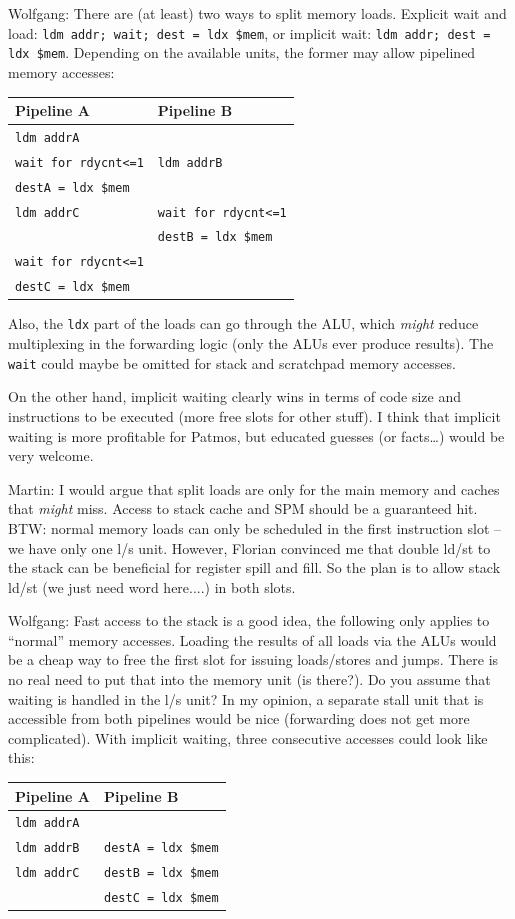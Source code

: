 \documentclass{IEEEtran}
\newcommand{\wolf}[1]{{\color{OliveGreen} Wolfgang: #1}}
\newcommand{\martin}[1]{{\color{blue} Martin: #1}}
\begin{document}
\wolf{There are (at least) two ways to split memory loads. Explicit wait and
load: \texttt{ldm addr; wait; dest = ldx \$mem}, or implicit wait:
\texttt{ldm addr; dest = ldx \$mem}. Depending on the available units,
the former may allow pipelined memory accesses:

\medskip
\begin{tabular}{ll}
  Pipeline A & Pipeline B \\
  \hline
  \texttt{ldm addrA} & \\
  \texttt{wait for rdycnt<=1} & \texttt{ldm addrB} \\
  \texttt{destA = ldx \$mem} & \\
  \texttt{ldm addrC} & \texttt{wait for rdycnt<=1} \\
                     & \texttt{destB = ldx \$mem} \\
  \texttt{wait for rdycnt<=1} & \\
  \texttt{destC = ldx \$mem} & \\
\end{tabular}

\medskip
Also, the \texttt{ldx} part of the loads can go through the ALU, which
\emph{might} reduce multiplexing in the forwarding logic (only the
ALUs ever produce results). The \texttt{wait} could maybe be omitted
for stack and scratchpad memory accesses.

On the other hand, implicit waiting clearly wins in terms of code size
and instructions to be executed (more free slots for other stuff).  I
think that implicit waiting is more profitable for Patmos, but
educated guesses (or facts\ldots) would be very welcome.}

\martin{I would argue that split loads are only for the main memory and
caches that \emph{might} miss. Access to stack cache and SPM should
be a guaranteed hit. BTW: normal memory loads can only be scheduled
in the first instruction slot -- we have only one l/s unit. However, Florian
convinced me that double ld/st to the stack can be beneficial for register
spill and fill. So the plan is to allow stack ld/st (we just need word here....)
in both slots.}

\wolf{Fast access to the stack is a good idea, the following only
  applies to ``normal'' memory accesses. Loading the results of all
  loads via the ALUs would be a cheap way to free the first slot for
  issuing loads/stores and jumps. There is no real need to put that
  into the memory unit (is there?). Do you assume that waiting is
  handled in the l/s unit? In my opinion, a separate stall unit that
  is accessible from both pipelines would be nice (forwarding does not
  get more complicated). With implicit waiting, three consecutive
  accesses could look like this:

  \medskip
  \begin{tabular}{ll}
    Pipeline A & Pipeline B \\
    \hline
    \texttt{ldm addrA} & \\
    \texttt{ldm addrB} & \texttt{destA = ldx \$mem} \\
    \texttt{ldm addrC} & \texttt{destB = ldx \$mem} \\
                       & \texttt{destC = ldx \$mem} \\
  \end{tabular}
}
\end{document}
